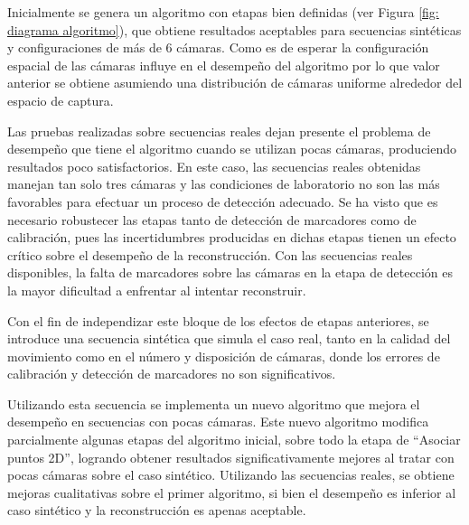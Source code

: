 Inicialmente se genera un algoritmo con etapas bien definidas (ver Figura \ref{fig: diagrama algoritmo}), que obtiene resultados aceptables para secuencias sintéticas y configuraciones de más de 6 cámaras. Como es de esperar la configuración espacial de las cámaras influye en el desempeño del algoritmo por lo que valor anterior se obtiene asumiendo una distribución de cámaras uniforme alrededor del espacio de captura.


Las pruebas realizadas sobre secuencias reales dejan presente el problema de desempeño que tiene el algoritmo cuando se utilizan pocas cámaras, produciendo resultados poco satisfactorios. 
En este caso, las secuencias reales obtenidas manejan tan solo tres cámaras y las condiciones de laboratorio no son las más favorables para efectuar un proceso de detección adecuado. Se ha visto que es necesario robustecer las etapas tanto de detección de marcadores  como de calibración, pues las incertidumbres producidas en dichas etapas tienen un efecto crítico sobre el desempeño de la reconstrucción. Con las secuencias reales disponibles, la falta de marcadores sobre las cámaras en la etapa de detección es la mayor dificultad a enfrentar al intentar reconstruir. 



Con el fin de independizar este bloque de los efectos de etapas anteriores, se introduce una secuencia sintética que simula el caso real, tanto en la calidad del movimiento como en el número y disposición de cámaras, donde los errores de calibración y detección de marcadores no son significativos.


Utilizando esta secuencia se implementa un nuevo algoritmo que mejora el desempeño en secuencias con pocas cámaras. Este nuevo algoritmo modifica parcialmente algunas etapas del algoritmo inicial, sobre todo la etapa de “Asociar puntos 2D”, logrando obtener resultados significativamente mejores al tratar con pocas cámaras sobre el caso sintético.
Utilizando las secuencias reales, se obtiene mejoras cualitativas sobre el primer algoritmo, si bien el desempeño es inferior al caso sintético y la reconstrucción es apenas aceptable.  \\ 



